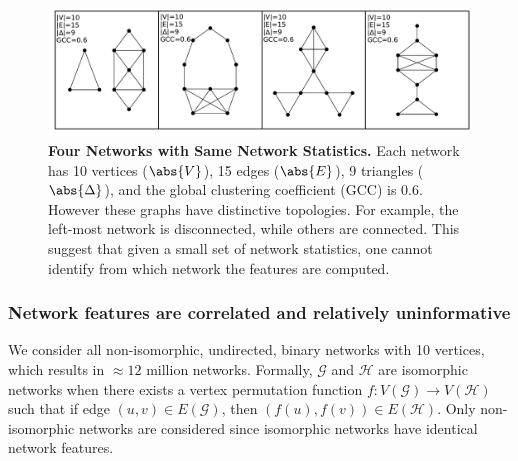 \begin{figure}
    \centering
    \includegraphics[width=.9\textwidth]{figures/dnd/exp5_10nodes_row}
    \caption{
    \textbf{Four Networks with Same Network Statistics.} Each network has 10 vertices ($\abs{V}$), 15 edges ($\abs{E}$), 9 triangles ($\abs{\Delta}$), and the global clustering coefficient (GCC) is 0.6. However these graphs have distinctive topologies. For example, the left-most network is disconnected, while others are connected. This suggest that given a small set of network statistics, one cannot identify from which network the features are computed.
    }
    \label{fig:exp5}
\end{figure}

\subsubsection{Network features are correlated and relatively uninformative}
We consider all non-isomorphic, undirected, binary networks with 10 vertices, which results in $\approx12$ million networks. Formally, $\mathcal{G}$ and $\mathcal{H}$ are isomorphic networks when there exists a vertex permutation function $f:V(\mathcal{G})\rightarrow V(\mathcal{H})$ such that if edge $(u,v)\in E(\mathcal{G})$, then $(f(u), f(v))\in E(\mathcal{H})$. Only non-isomorphic networks are considered since isomorphic networks have identical network features.

